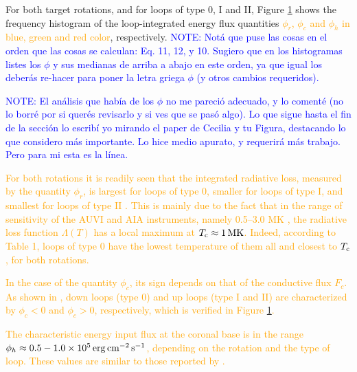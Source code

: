 \documentclass[namedreferences]{solarphysics}
\newcommand{\MK}{{\rm MK}}
\newcommand{\cm}{{\rm cm}}
\newcommand{\cminvs}{\cm^{-2}}
\newcommand{\erg}{{\rm erg}}
\newcommand{\s}{{\rm s}}
\newcommand{\Tc}{T_{\rm c}}
\def\albert#1{\textcolor{orange}{#1}}
\def\notebyalbert#1{\textcolor{blue}{NOTE: #1}}
\begin{document}
\begin{article}
\begin{figure}[ht]
\begin{center}
\label{energia_demt}
\end{center}
\end{figure} 

For both target rotations, and for loops of type 0, I and II, Figure \ref{energia_demt} shows the frequency histogram of the loop-integrated energy flux quantities \albert{$\phi_r$, $\phi_c$ and $\phi_h$ in blue, green and red color}, respectively. \notebyalbert{Notá que puse las cosas en el orden que las cosas se calculan: Eq. 11, 12, y 10. Sugiero que en los histogramas listes los $\phi$ y sus medianas de arriba a abajo en este orden, ya que igual los deberás re-hacer para poner la letra griega $\phi$ (y otros cambios requeridos).}

\notebyalbert{El análisis que había de los $\phi$ no me pareció adecuado, y lo comenté (no lo borré por si querés revisarlo y si ves que se pasó algo). Lo que sigue hasta el fin de la sección lo escribí yo mirando el paper de Cecilia y tu Figura, destacando lo que considero más importante. Lo hice medio apurato, y requerirá más trabajo. Pero para mi esta es la línea.}

\albert{For both rotations it is readily seen that the integrated radiative loss, measured by the quantity $\phi_r$, is largest for loops of type 0, smaller for loops of type I, and smallest for loops of type II . This is mainly due to the fact that in the range of sensitivity of the AUVI and AIA instruments, namely 0.5–3.0 MK \citep{nuevo_2015}, the radiative loss function $\Lambda(T)$ has a local maximum at $\Tc\approx 1\,\MK$. Indeed, according to Table 1, loops of type 0 have the lowest temperature of them all and closest to $\Tc$, for both rotations.}

\albert{In the case of the quantity $\phi_c$, its sign depends on that of the conductive flux $F_c$. As shown in \citet{maccormack_2017}, down loops (type 0) and up loops (type I and II) are characterized by $\phi_c<0$ and $\phi_c>0$, respectively, which is verified in Figure \ref{energia_demt}.}

\albert{The characteristic energy input flux at the coronal base is in the range $\phi_h\approx 0.5-1.0 \times 10^5\,\erg\,\cminvs\,\s^{-1}$, depending on the rotation and the type of loop. These values are similar to those reported by \citet{maccormack_2017}.}



\end{article}
\end{document}
